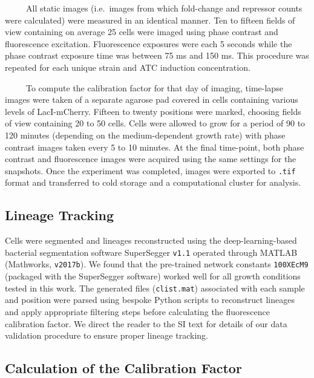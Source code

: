 \documentclass[12pt]{caltech_thesis}
\begin{document}
~~~~~All static images (i.e.~images from which fold-change and repressor
counts were calculated) were measured in an identical manner. Ten to
fifteen fields of view containing on average 25 cells were imaged using
phase contrast and fluorescence excitation. Fluorescence exposures were
each 5 seconds while the phase contrast exposure time was between 75 ms
and 150 ms. This procedure was repeated for each unique strain and ATC
induction concentration.

~~~~~To compute the calibration factor for that day of imaging,
time-lapse images were taken of a separate agarose pad covered in cells
containing various levels of LacI-mCherry. Fifteen to twenty positions
were marked, choosing fields of view containing 20 to 50 cells. Cells
were allowed to grow for a period of 90 to 120 minutes (depending on the
medium-dependent growth rate) with phase contrast images taken every 5
to 10 minutes. At the final time-point, both phase contrast and
fluorescence images were acquired using the same settings for the
snapshots. Once the experiment was completed, images were exported to
\texttt{.tif} format and transferred to cold storage and a computational
cluster for analysis.

\hypertarget{lineage-tracking}{%
\subsection{Lineage Tracking}\label{lineage-tracking}}

Cells were segmented and lineages reconstructed using the
deep-learning-based bacterial segmentation software SuperSegger
\texttt{v1.1} \autocite{stylianidou2016,cass2017} operated through
MATLAB (Mathworks, \texttt{v2017b}). We found that the pre-trained
network constants \texttt{100XEcM9} (packaged with the SuperSegger
software) worked well for all growth conditions tested in this work. The
generated files (\texttt{clist.mat}) associated with each sample and
position were parsed using bespoke Python scripts to reconstruct
lineages and apply appropriate filtering steps before calculating the
fluorescence calibration factor. We direct the reader to the SI text for
details of our data validation procedure to ensure proper lineage
tracking.

\hypertarget{calculation-of-the-calibration-factor}{%
\subsection{Calculation of the Calibration
Factor}\label{calculation-of-the-calibration-factor}}
\end{document}

